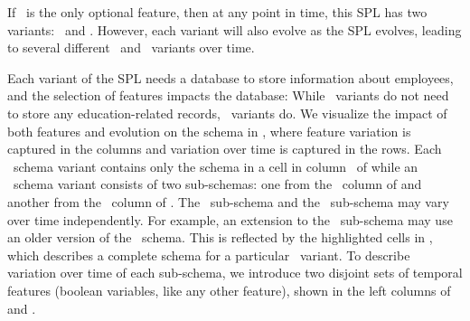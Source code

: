 If \edu\ is the only optional feature, then at any point in time, this SPL has
two variants: \basic\ and \educational. However, each variant will also evolve
as the SPL evolves, leading to several different \basic\ and \educational\
variants over time.


Each variant of the SPL needs a database to store information
about employees, and the selection of features impacts the database: While
\basic\ variants do not need to store any education-related records,
\educational\ variants do. 
We visualize the impact of both features and evolution on the schema in
\tabref{mot}, where feature variation is captured in the columns and variation
over time is captured in the rows.
%
%
Each \basic\ schema variant contains only the schema in a cell in column \basic\
of  while an \educational\ schema variant consists of two sub-schemas: one from the \basic\
column of  and another from the \educational\ column of .
%
The \basic\ sub-schema and the \educational\ sub-schema may vary over time
independently. For example, an extension to the \educational\ sub-schema may
use an older version of the \basic\ schema. This is reflected by the
highlighted cells in \tabref{mot}, which describes a complete schema for a
particular \educational\ variant.
%
To describe variation over time of each sub-schema, we introduce two disjoint
sets of temporal features (boolean variables, like any other feature), shown in
the left columns of  and .



